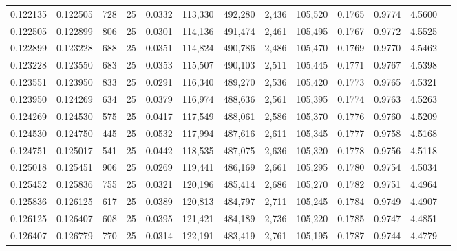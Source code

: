 \begin{tabular}{rrrrrrrrrrrrr}
0.122135 & 0.122505 &   728 &  25 &                                     0.0332 & 113,330 & 492,280 &   2,436 & 105,520 & 0.1765 & 0.9774 & 4.5600 \\
0.122505 & 0.122899 &   806 &  25 &                                     0.0301 & 114,136 & 491,474 &   2,461 & 105,495 & 0.1767 & 0.9772 & 4.5525 \\
0.122899 & 0.123228 &   688 &  25 &                                     0.0351 & 114,824 & 490,786 &   2,486 & 105,470 & 0.1769 & 0.9770 & 4.5462 \\
0.123228 & 0.123550 &   683 &  25 &                                     0.0353 & 115,507 & 490,103 &   2,511 & 105,445 & 0.1771 & 0.9767 & 4.5398 \\
0.123551 & 0.123950 &   833 &  25 &                                     0.0291 & 116,340 & 489,270 &   2,536 & 105,420 & 0.1773 & 0.9765 & 4.5321 \\
0.123950 & 0.124269 &   634 &  25 &                                     0.0379 & 116,974 & 488,636 &   2,561 & 105,395 & 0.1774 & 0.9763 & 4.5263 \\
0.124269 & 0.124530 &   575 &  25 &                                     0.0417 & 117,549 & 488,061 &   2,586 & 105,370 & 0.1776 & 0.9760 & 4.5209 \\
0.124530 & 0.124750 &   445 &  25 &                                     0.0532 & 117,994 & 487,616 &   2,611 & 105,345 & 0.1777 & 0.9758 & 4.5168 \\
0.124751 & 0.125017 &   541 &  25 &                                     0.0442 & 118,535 & 487,075 &   2,636 & 105,320 & 0.1778 & 0.9756 & 4.5118 \\
0.125018 & 0.125451 &   906 &  25 &                                     0.0269 & 119,441 & 486,169 &   2,661 & 105,295 & 0.1780 & 0.9754 & 4.5034 \\
0.125452 & 0.125836 &   755 &  25 &                                     0.0321 & 120,196 & 485,414 &   2,686 & 105,270 & 0.1782 & 0.9751 & 4.4964 \\
0.125836 & 0.126125 &   617 &  25 &                                     0.0389 & 120,813 & 484,797 &   2,711 & 105,245 & 0.1784 & 0.9749 & 4.4907 \\
0.126125 & 0.126407 &   608 &  25 &                                     0.0395 & 121,421 & 484,189 &   2,736 & 105,220 & 0.1785 & 0.9747 & 4.4851 \\
0.126407 & 0.126779 &   770 &  25 &                                     0.0314 & 122,191 & 483,419 &   2,761 & 105,195 & 0.1787 & 0.9744 & 4.4779 \\

\end{tabular}
